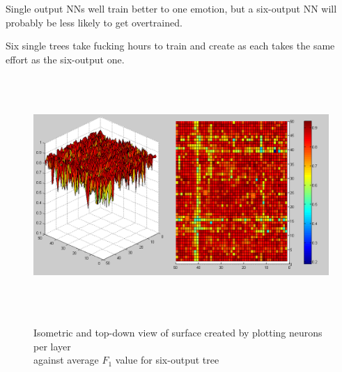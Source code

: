 \documentclass[a4paper]{article}
\begin{document}




Single output NNs well train better to one emotion, but a six-output NN will probably be 
less likely to get overtrained.

Six single trees take fucking hours to train and create as each takes the same effort as the six-output one.

\begin{figure}[p]
  \centering
  {\includegraphics[height=90mm]{6-out-topology.png}}
  \caption{Isometric and top-down view of surface created by plotting neurons per layer \\ against average $F_1$ value for six-output tree}
\end{figure}
\end{document}
